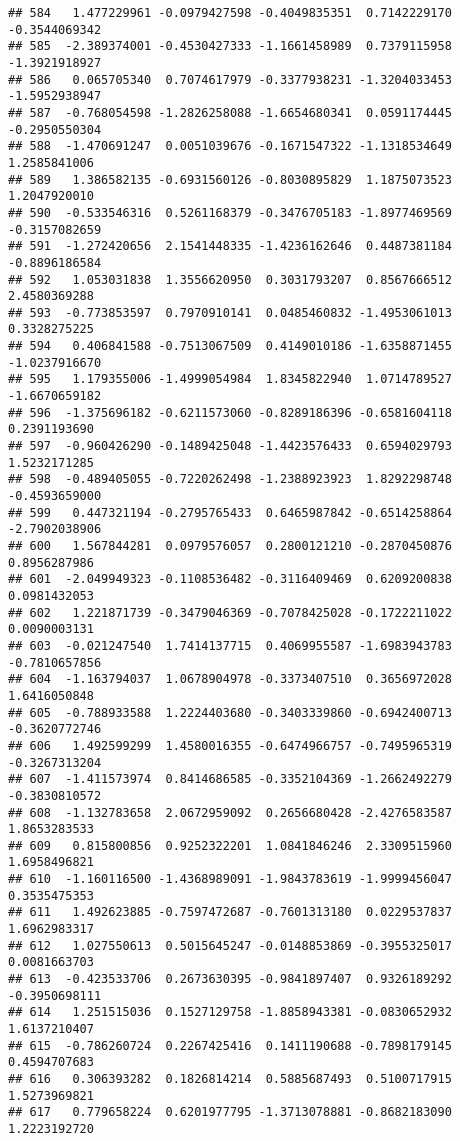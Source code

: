 \documentclass[
]{article}
\begin{document}
\begin{verbatim}
## 584   1.477229961 -0.0979427598 -0.4049835351  0.7142229170 -0.3544069342
## 585  -2.389374001 -0.4530427333 -1.1661458989  0.7379115958 -1.3921918927
## 586   0.065705340  0.7074617979 -0.3377938231 -1.3204033453 -1.5952938947
## 587  -0.768054598 -1.2826258088 -1.6654680341  0.0591174445 -0.2950550304
## 588  -1.470691247  0.0051039676 -0.1671547322 -1.1318534649  1.2585841006
## 589   1.386582135 -0.6931560126 -0.8030895829  1.1875073523  1.2047920010
## 590  -0.533546316  0.5261168379 -0.3476705183 -1.8977469569 -0.3157082659
## 591  -1.272420656  2.1541448335 -1.4236162646  0.4487381184 -0.8896186584
## 592   1.053031838  1.3556620950  0.3031793207  0.8567666512  2.4580369288
## 593  -0.773853597  0.7970910141  0.0485460832 -1.4953061013  0.3328275225
## 594   0.406841588 -0.7513067509  0.4149010186 -1.6358871455 -1.0237916670
## 595   1.179355006 -1.4999054984  1.8345822940  1.0714789527 -1.6670659182
## 596  -1.375696182 -0.6211573060 -0.8289186396 -0.6581604118  0.2391193690
## 597  -0.960426290 -0.1489425048 -1.4423576433  0.6594029793  1.5232171285
## 598  -0.489405055 -0.7220262498 -1.2388923923  1.8292298748 -0.4593659000
## 599   0.447321194 -0.2795765433  0.6465987842 -0.6514258864 -2.7902038906
## 600   1.567844281  0.0979576057  0.2800121210 -0.2870450876  0.8956287986
## 601  -2.049949323 -0.1108536482 -0.3116409469  0.6209200838  0.0981432053
## 602   1.221871739 -0.3479046369 -0.7078425028 -0.1722211022  0.0090003131
## 603  -0.021247540  1.7414137715  0.4069955587 -1.6983943783 -0.7810657856
## 604  -1.163794037  1.0678904978 -0.3373407510  0.3656972028  1.6416050848
## 605  -0.788933588  1.2224403680 -0.3403339860 -0.6942400713 -0.3620772746
## 606   1.492599299  1.4580016355 -0.6474966757 -0.7495965319 -0.3267313204
## 607  -1.411573974  0.8414686585 -0.3352104369 -1.2662492279 -0.3830810572
## 608  -1.132783658  2.0672959092  0.2656680428 -2.4276583587  1.8653283533
## 609   0.815800856  0.9252322201  1.0841846246  2.3309515960  1.6958496821
## 610  -1.160116500 -1.4368989091 -1.9843783619 -1.9999456047  0.3535475353
## 611   1.492623885 -0.7597472687 -0.7601313180  0.0229537837  1.6962983317
## 612   1.027550613  0.5015645247 -0.0148853869 -0.3955325017  0.0081663703
## 613  -0.423533706  0.2673630395 -0.9841897407  0.9326189292 -0.3950698111
## 614   1.251515036  0.1527129758 -1.8858943381 -0.0830652932  1.6137210407
## 615  -0.786260724  0.2267425416  0.1411190688 -0.7898179145  0.4594707683
## 616   0.306393282  0.1826814214  0.5885687493  0.5100717915  1.5273969821
## 617   0.779658224  0.6201977795 -1.3713078881 -0.8682183090  1.2223192720

\end{verbatim}
\end{document}

